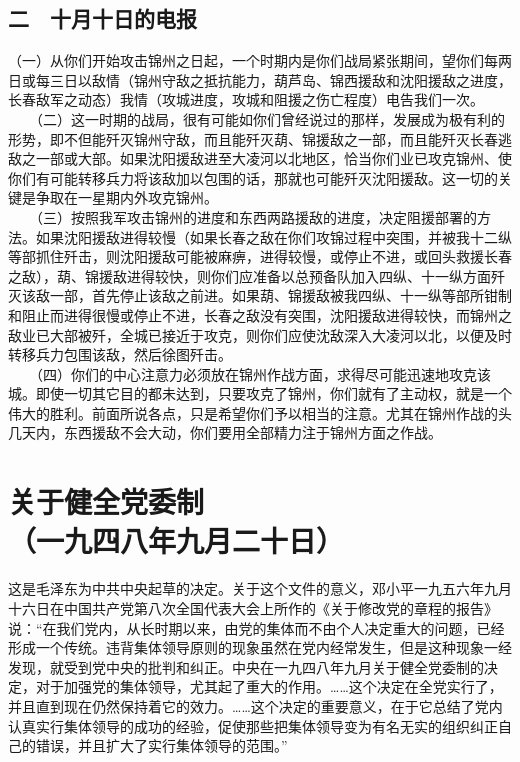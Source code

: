 \documentclass[cn,11pt,chinese]{elegantbook}
\def\myformat#1{\hfil\hfil #1}
\begin{document}
\subsection*{\myformat{二　十月十日的电报}}
（一）从你们开始攻击锦州之日起，一个时期内是你们战局紧张期间，望你们每两日或每三日以敌情（锦州守敌之抵抗能力，葫芦岛、锦西援敌和沈阳援敌之进度，长春敌军之动态）我情（攻城进度，攻城和阻援之伤亡程度）电告我们一次。\\
　　（二）这一时期的战局，很有可能如你们曾经说过的那样，发展成为极有利的形势，即不但能歼灭锦州守敌，而且能歼灭葫、锦援敌之一部，而且能歼灭长春逃敌之一部或大部。如果沈阳援敌进至大凌河以北地区，恰当你们业已攻克锦州、使你们有可能转移兵力将该敌加以包围的话，那就也可能歼灭沈阳援敌。这一切的关键是争取在一星期内外攻克锦州。\\
　　（三）按照我军攻击锦州的进度和东西两路援敌的进度，决定阻援部署的方法。如果沈阳援敌进得较慢（如果长春之敌在你们攻锦过程中突围，并被我十二纵等部抓住歼击，则沈阳援敌可能被麻痹，进得较慢，或停止不进，或回头救援长春之敌），葫、锦援敌进得较快，则你们应准备以总预备队加入四纵、十一纵方面歼灭该敌一部，首先停止该敌之前进。如果葫、锦援敌被我四纵、十一纵等部所钳制和阻止而进得很慢或停止不进，长春之敌没有突围，沈阳援敌进得较快，而锦州之敌业已大部被歼，全城已接近于攻克，则你们应使沈敌深入大凌河以北，以便及时转移兵力包围该敌，然后徐图歼击。\\
　　（四）你们的中心注意力必须放在锦州作战方面，求得尽可能迅速地攻克该城。即使一切其它目的都未达到，只要攻克了锦州，你们就有了主动权，就是一个伟大的胜利。前面所说各点，只是希望你们予以相当的注意。尤其在锦州作战的头几天内，东西援敌不会大动，你们要用全部精力注于锦州方面之作战。\\
\newpage\section*{\myformat{关于健全党委制}\\\myformat{（一九四八年九月二十日）}}
\begin{introduction}\item  这是毛泽东为中共中央起草的决定。关于这个文件的意义，邓小平一九五六年九月十六日在中国共产党第八次全国代表大会上所作的《关于修改党的章程的报告》说：“在我们党内，从长时期以来，由党的集体而不由个人决定重大的问题，已经形成一个传统。违背集体领导原则的现象虽然在党内经常发生，但是这种现象一经发现，就受到党中央的批判和纠正。中央在一九四八年九月关于健全党委制的决定，对于加强党的集体领导，尤其起了重大的作用。……这个决定在全党实行了，并且直到现在仍然保持着它的效力。……这个决定的重要意义，在于它总结了党内认真实行集体领导的成功的经验，促使那些把集体领导变为有名无实的组织纠正自己的错误，并且扩大了实行集体领导的范围。”\end{introduction}
\end{document}
